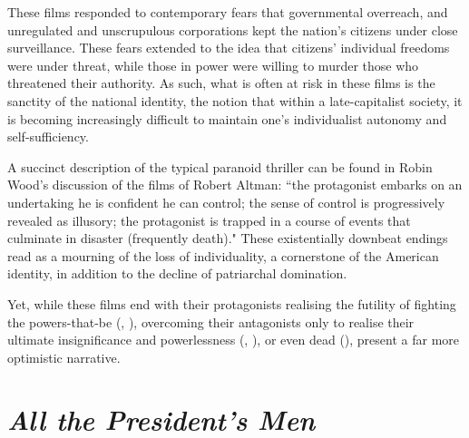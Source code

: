 These films responded to contemporary fears that governmental overreach, and unregulated and unscrupulous corporations kept the nation's citizens under close surveillance.
These fears extended to the idea that citizens' individual freedoms were under threat, while those in power were willing to murder those who threatened their authority.
As such, what is often at risk in these films is the sanctity of the national identity, the notion that within a late-capitalist society, it is becoming increasingly difficult to maintain one's individualist autonomy and self-sufficiency.

A succinct description of the typical paranoid thriller can be found in Robin Wood's discussion of the films of Robert Altman: ``the protagonist embarks on an undertaking he is confident he can control; the sense of control is progressively revealed as illusory; the protagonist is trapped in a course of events that culminate in disaster (frequently death)."\autocites[Although Wood here is referring specifically to the films of director Robert Altman, who did not direct any paranoid thrillers, his summation perfectly mirrors the paranoid thriller. This can be seen as justification of the claim that this is perhaps the quintessential genre of the period, and a perfect crystallisation of the paranoia and disillusionment that apparently encapsulated the era.][27]{wood_hollywood_1986}
These existentially downbeat endings read as a mourning of the loss of individuality, a cornerstone of the American identity, in addition to the decline of patriarchal domination.

Yet, while these films end with their protagonists realising the futility of fighting the powers-that-be (, ), overcoming their antagonists only to realise their ultimate insignificance and powerlessness (, ), or even dead (),  present a far more optimistic narrative.


\section{\textit{All the President's Men}}

